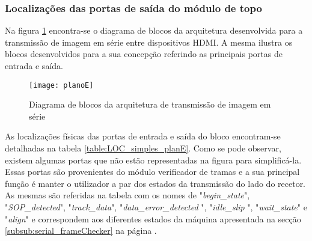 \subsubsection*{Localizações das portas de saída do módulo de topo} \label{subsub:serial_locs_planE}

Na figura \ref{fig:planoE} encontra-se o diagrama de blocos da arquitetura desenvolvida para a transmissão de imagem em série entre dispositivos HDMI. A mesma ilustra os blocos desenvolvidos para a sua concepção referindo as principais portas de entrada e saída.

\begin{figure}[h!]
	\begin{center}
		\leavevmode
		\texttt{[image: planoE]}
		\captionsetup{width=1.0\linewidth}
		\caption[Diagrama de blocos da arquitetura de transmissão de imagem em série]{Diagrama de blocos da arquitetura de transmissão de imagem em série}
		\label{fig:planoE}
	\end{center}
\end{figure}

As localizações físicas das portas de entrada e saída do bloco encontram-se detalhadas na tabela \ref{table:LOC_simples_planE}. Como se pode observar, existem algumas portas que não estão representadas na figura \label{fig:planE} para simplificá-la. Essas portas são provenientes do módulo verificador de tramas e a sua principal função é manter o utilizador a par dos estados da transmissão do lado do recetor.  As mesmas são referidas na tabela com os nomes de "\textit{begin\_state}", "\textit{SOP\_detected}", "\textit{track\_data}", "\textit{data\_error\_detected }", "\textit{idle\_slip }", "\textit{wait\_state}" e "\textit{align}" e correspondem aos diferentes estados da máquina apresentada na secção \ref{subsub:serial_frameChecker} na página \pageref{subsub:serial_frameChecker}.

